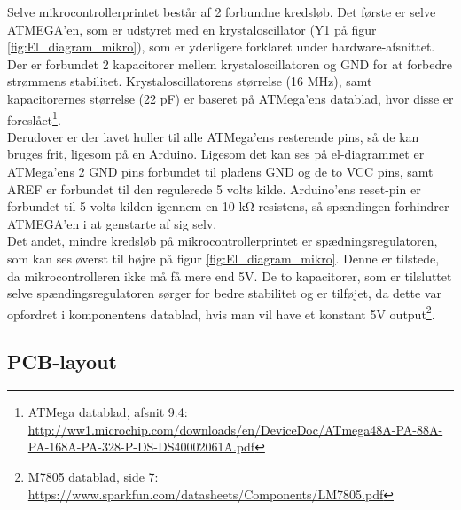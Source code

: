 Selve mikrocontrollerprintet består af 2 forbundne kredsløb. Det første er selve ATMEGA’en, som er udstyret med en krystaloscillator (Y1 på figur \ref{fig:El_diagram_mikro}), som er yderligere forklaret under hardware-afsnittet. Der er forbundet 2 kapacitorer mellem krystaloscillatoren og GND for at forbedre strømmens stabilitet. Krystaloscillatorens størrelse (16 MHz), samt kapacitorernes størrelse (22 pF) er baseret på ATMega’ens datablad, hvor disse er foreslået\footnote{ATMega datablad, afsnit 9.4: \url{http://ww1.microchip.com/downloads/en/DeviceDoc/ATmega48A-PA-88A-PA-168A-PA-328-P-DS-DS40002061A.pdf}}.\\

Derudover er der lavet huller til alle ATMega’ens resterende pins, så de kan bruges frit, ligesom på en Arduino. Ligesom det kan ses på el-diagrammet er ATMega’ens 2 GND pins forbundet til pladens GND og de to VCC pins, samt AREF er forbundet til den regulerede 5 volts kilde. Arduino’ens reset-pin er forbundet til 5 volts kilden igennem en 10 kΩ resistens, så spændingen forhindrer ATMEGA’en i at genstarte af sig selv.\\

Det andet, mindre kredsløb på mikrocontrollerprintet er spædningsregulatoren, som kan ses øverst til højre på figur \ref{fig:El_diagram_mikro}. Denne er tilstede, da mikrocontrolleren ikke må få mere end 5V. De to kapacitorer, som er tilsluttet selve spændingsregulatoren sørger for bedre stabilitet og er tilføjet, da dette var opfordret i komponentens datablad, hvis man vil have et konstant 5V output\footnote{M7805 datablad, side 7: \url{https://www.sparkfun.com/datasheets/Components/LM7805.pdf}}.

\subsection{PCB-layout}

